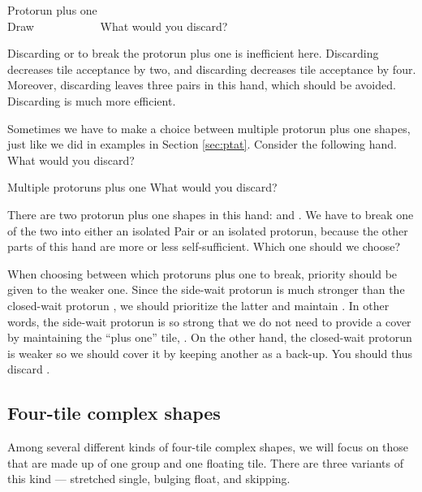 \begin{itembox}[r]{Protorun plus one}
\bp
{}~\\
\hfill\footnotesize{Draw~~~~~~~~~~~}
\ep
\vspace{-15pt}What would you discard? \vspace{-5pt}
\end{itembox}
\noindent
Discarding {\LARGE{}} or {\LARGE{}} to break the protorun plus one {\LARGE{}} is inefficient here. Discarding {\LARGE{}} decreases tile acceptance by two, and discarding {\LARGE{}} decreases tile acceptance by four. Moreover, discarding {\LARGE{}} leaves three pairs in this hand, which should be avoided. Discarding {\LARGE{}} is much more efficient. 

\bigskip

Sometimes we have to make a choice between multiple protorun plus one shapes, just like we did in examples in Section \ref{sec:ptat}. 
Consider the following hand. What would you discard?
\begin{itembox}[r]{Multiple protoruns plus one}
\bp
{}\bei\bei
\ep
\vspace{-10pt}What would you discard? \vspace{-5pt}
\end{itembox}
\noindent
There are two protorun plus one shapes in this hand: {\LARGE{}} and {\LARGE{}}. We have to break one of the two into either an isolated Pair or an isolated protorun, because the other parts of this hand are more or less self-sufficient. Which one should we choose?

\bigskip
When choosing between which protoruns plus one to break, priority should be given to the weaker one. Since the side-wait protorun {\LARGE{}} is much stronger than the closed-wait protorun {\LARGE{}}, we should prioritize the latter and maintain {\LARGE{}}. In other words, the side-wait protorun {\LARGE{}} is so strong that we do not need to provide a cover by maintaining the ``plus one'' tile, {\LARGE{}}. On the other hand, the closed-wait protorun {\LARGE{}} is weaker so we should cover it by keeping another {\LARGE{}} as a back-up. You should thus discard {\LARGE{}}. 

\subsection{Four-tile complex shapes} 
Among several different kinds of four-tile complex shapes, we will focus on those that are made up of one group and one floating tile. There are three variants of this kind --- stretched single, bulging float, and skipping.

